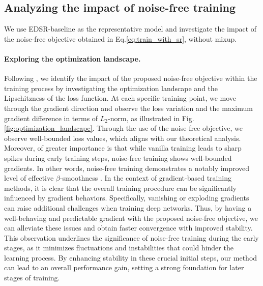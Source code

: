 \documentclass[letterpaper]{article} %
\begin{document}
\subsection{Analyzing the impact of noise-free training} \label{section:analysis}
We use EDSR-baseline \cite{SISR2_EDSR} as the representative model and investigate the impact of the noise-free objective obtained in Eq.\eqref{eq:train_with_sr}, without mixup.

%
\paragraph{Exploring the optimization landscape.}
Following \cite{how_does_batchnorm_help}, we identify the impact of the proposed noise-free objective within the training process by investigating the optimization landscape and the Lipschitzness of the loss function.
%
At each specific training point, we move through the gradient direction and observe the loss variation and the maximum gradient difference in terms of $L_2$-norm, as illustrated in Fig.\ref{fig:optimization_landscape}.
%
Through the use of the noise-free objective, we observe well-bounded loss values, which aligns with our theoretical analysis.
Moreover, of greater importance is that while vanilla training leads to sharp spikes during early training steps, noise-free training shows well-bounded gradients.
In other words, noise-free training demonstrates a notably improved level of effective $\beta$-smoothness \cite{beta_smoothness, how_does_batchnorm_help}.
%
In the context of gradient-based training methods, it is clear that the overall training procedure can be significantly influenced by gradient behaviors. Specifically, vanishing or exploding gradients can raise additional challenges when training deep networks.
Thus, by having a well-behaving and predictable gradient with the proposed noise-free objective, we can alleviate these issues and obtain faster convergence with improved stability.
%
This observation underlines the significance of noise-free training during the early stages, as it minimizes fluctuations and instabilities that could hinder the learning process. By enhancing stability in these crucial initial steps, our method can lead to an overall performance gain, setting a strong foundation for later stages of training.
%
%
%
%
%
\end{document}
